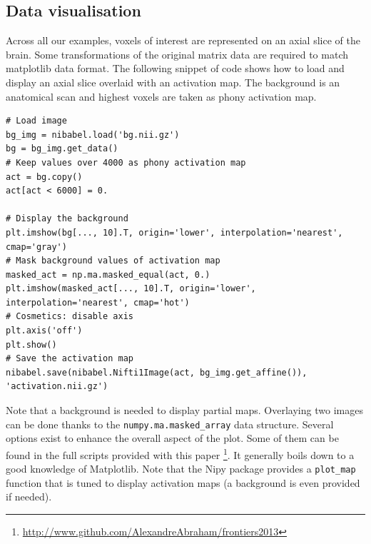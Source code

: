 \documentclass{frontiersSCNS} %
\begin{document}
\subsection{Data visualisation}

Across all our examples, voxels of interest are represented on an axial slice of
the brain. Some transformations of the original matrix data are required to match
matplotlib data format. The following snippet of code shows how to load and
display an axial slice overlaid with an activation map. The background is an
anatomical scan and highest voxels are taken as phony activation map.

\begin{lstlisting}
# Load image
bg_img = nibabel.load('bg.nii.gz')
bg = bg_img.get_data()
# Keep values over 4000 as phony activation map
act = bg.copy()
act[act < 6000] = 0.

# Display the background
plt.imshow(bg[..., 10].T, origin='lower', interpolation='nearest', cmap='gray')
# Mask background values of activation map
masked_act = np.ma.masked_equal(act, 0.)
plt.imshow(masked_act[..., 10].T, origin='lower', interpolation='nearest', cmap='hot')
# Cosmetics: disable axis
plt.axis('off')
plt.show()
# Save the activation map
nibabel.save(nibabel.Nifti1Image(act, bg_img.get_affine()), 'activation.nii.gz')
\end{lstlisting}

Note that a background is needed to display partial maps. Overlaying two images
can be done thanks to the \texttt{numpy.ma.masked\_array} data structure.
Several options exist to enhance the overall aspect of the plot.
Some of them can be found in the full scripts provided with this paper
\footnote{\url{http://www.github.com/AlexandreAbraham/frontiers2013}}. It generally
boils down to a good knowledge of Matplotlib. Note that the Nipy package provides a
\texttt{plot\_map} function that is tuned to display activation maps (a
background is even provided if needed).



\end{document}
